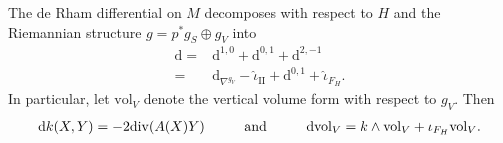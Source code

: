\documentclass[psamsfonts]{amsart}
\theoremstyle{plain}
\theoremstyle{definition}{
\newtheorem{defi}{Definition}[section]
\newtheorem{ass}{Assumption}
\newtheorem*{nota}{Notation}}
\theoremstyle{remark}{
\newtheorem{rem}{Remark}
\newtheorem{ex}{Example}}
\theoremstyle{plain}{
\newtheorem{thm}{Theorem}[section]
\newtheorem{lem}{Lemma}[section]
\newtheorem{cor}{Corollary}[section]
\newtheorem{prop}{Proposition}[section]
\newtheorem{con}{Conjecture}[section]}
\newcommand{\m}[1]{{\mathrm{#1}}}
\newcommand{\und}[1]{\hspace{#1}\text{and}\hspace{#1}}
\begin{document}
\begin{rem}\cite[Prop. 10.1]{berline1992heat}
The de Rham differential on $M$ decomposes with respect to $H$ and the Riemannian structure $g=p^*g_S\oplus g_{V}$ into 
\begin{align*}
    \m{d}=&\m{d}^{1,0}+\m{d}^{0,1}+\m{d}^{2,-1}\\
    =&\m{d}_{\nabla^{g_{V}}}-\hat{\iota}_{\m{II}}+\m{d}^{0,1}+\hat{\iota}_{F_H}.
\end{align*}
In particular, let $\m{vol}_{V}$ denote the vertical volume form with respect to $g_{V}$. Then 
\begin{align*}
    \m{d}k(X,Y)=-2\m{div}(A(X)Y)\und{1.0cm}\m{d}\m{vol}_{V}=k\wedge\m{vol}_{V}+\iota_{F_{H}}\m{vol}_{V}.
\end{align*}
\end{rem}





\end{document}

